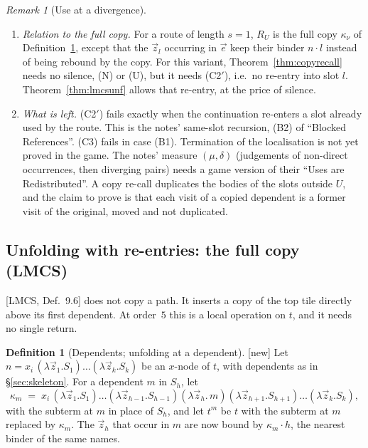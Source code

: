 \documentclass[11pt]{article}
\newcommand{\suc}[2]{#1{\cdot}#2}
\newcommand{\New}{\textsf{[new]}}
\theoremstyle{plain}
\theoremstyle{definition}
\newtheorem{definition}[theorem]{Definition}
\theoremstyle{remark}
\newtheorem{remark}[theorem]{Remark}
\begin{document}
\begin{remark}[Use at a divergence]
\begin{enumerate}
\item \emph{Relation to the full copy.}  For a route of length $s=1$,
  $R_U$ is the full copy $\kappa_\nu$ of Definition~\ref{def:lmcsunf},
  except that the $\vec z_l$ occurring in $\vec e$ keep their binder
  $\suc nl$ instead of being rebound by the copy.  For this variant,
  Theorem~\ref{thm:copyrecall} needs no silence, (N) or (U), but it
  needs (C2$'$), i.e.\ no re-entry into slot $l$.
  Theorem~\ref{thm:lmcsunf} allows that re-entry, at the price of
  silence.
\item \emph{What is left.}  (C2$'$) fails exactly when the continuation
  re-enters a slot already used by the route.  This is the notes'
  same-slot recursion, (B2) of ``Blocked References''.  (C3) fails in
  case (B1).  Termination of the localisation is not yet proved in the
  game.  The notes' measure $(\mu,\delta)$ (judgements of non-direct
  occurrences, then diverging pairs) needs a game version of their
  ``Uses are Redistributed''.  A copy re-call duplicates the bodies of
  the slots outside $U$, and the claim to prove is that each visit of a
  copied dependent is a former visit of the original, moved and not
  duplicated.
\end{enumerate}
\end{remark}


\subsection{Unfolding with re-entries: the full copy (LMCS)}\label{sec:lmcsunf}

[LMCS, Def.~9.6] does not copy a path.  It inserts a copy of the top
tile directly above its first dependent.  At order~$5$ this is a local
operation on $t$, and it needs no single return.

\begin{definition}[Dependents; unfolding at a dependent]\label{def:lmcsunf}
\New{} Let $n=x_i\,(\lambda\vec z_1.S_1)\dots(\lambda\vec z_k.S_k)$ be an
$x$-node of $t$, with dependents as in \S\ref{sec:skeleton}.  For a
dependent $m$ in $S_h$, let
\[
\kappa_m \;=\; x_i\,(\lambda\vec z_1.S_1)\dots(\lambda\vec z_{h-1}.S_{h-1})
(\lambda\vec z_h.\,m)(\lambda\vec z_{h+1}.S_{h+1})\dots(\lambda\vec z_k.S_k),
\]
with the subterm at $m$ in place of $S_h$, and let $t^m$ be $t$ with the
subterm at $m$ replaced by $\kappa_m$.  The $\vec z_h$ that occur in
$m$ are now bound by $\suc{\kappa_m}h$, the nearest binder of the same
names.
\end{definition}
\end{document}
